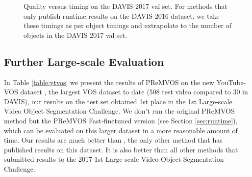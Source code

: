 \documentclass[runningheads]{llncs}
\begin{document}
\begin{figure}[t!]
{}
   \caption{Quality versus timing  on the DAVIS 2017 val set. For methods that only publish runtime results on the DAVIS 2016 dataset, we take these timings as per object timings and extrapolate to the number of objects in the DAVIS 2017 val set.}
   \label{fig:speed}
\end{figure}

\subsection{Further Large-scale Evaluation}

In Table \ref{table:ytvos} we present the results of PReMVOS on the new YouTube-VOS dataset \cite{xu2018youtubemethod}, the largest VOS dataset to date (508 test video compared to 30 in DAVIS), our results on the test set obtained 1st place in the 1st Large-scale Video Object Segmentation Challenge. We don't run the original PReMVOS method but the PReMVOS Fast-finetuned version (see Section \ref{sec:runtime}), which can be evaluated on this larger dataset in a more reasonable amount of time. Our results are much better than \cite{xu2018youtubemethod}, the only other method that has published results on this dataset. It is also better than all other methods that submitted results to the 2017 1st Large-scale Video Object Segmentation Challenge.
\end{document}
